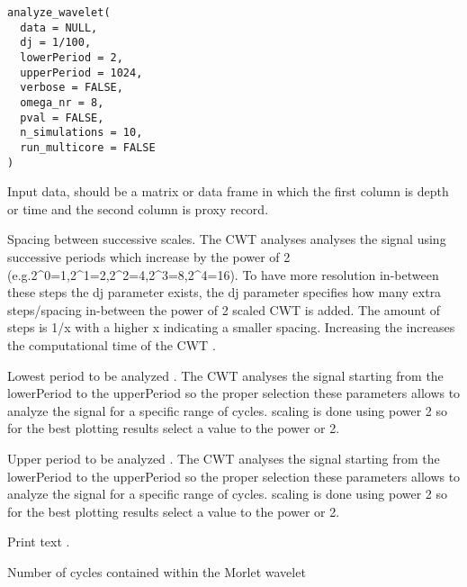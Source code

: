 \documentclass[a4paper]{book}
\begin{document}
%
\begin{Usage}
\begin{verbatim}
analyze_wavelet(
  data = NULL,
  dj = 1/100,
  lowerPeriod = 2,
  upperPeriod = 1024,
  verbose = FALSE,
  omega_nr = 8,
  pval = FALSE,
  n_simulations = 10,
  run_multicore = FALSE
)
\end{verbatim}
\end{Usage}
%
\begin{Arguments}
\begin{ldescription}
\item[\code{data}] Input data, should be a matrix or data frame in which
the first column is depth or time and the second column is proxy record.

\item[\code{dj}] Spacing between successive scales. The CWT analyses analyses the signal using successive periods
which increase by the power of 2 (e.g.2\textasciicircum{}0=1,2\textasciicircum{}1=2,2\textasciicircum{}2=4,2\textasciicircum{}3=8,2\textasciicircum{}4=16). To have more resolution
in-between these steps the dj parameter exists, the dj parameter specifies how many extra steps/spacing in-between
the power of 2 scaled CWT is added. The amount of steps is 1/x with a higher x indicating a smaller spacing.
Increasing the increases the computational time of the CWT .

\item[\code{lowerPeriod}] Lowest period to be analyzed .
The CWT analyses the signal starting from the lowerPeriod to the upperPeriod so the proper selection these
parameters allows to analyze the signal for a specific range of cycles.
scaling is done using power 2 so for the best plotting results select a value to the power or 2.

\item[\code{upperPeriod}] Upper period to be analyzed .
The CWT analyses the signal starting from the lowerPeriod to the upperPeriod so the proper selection these
parameters allows to analyze the signal for a specific range of cycles.
scaling is done using power 2 so for the best plotting results select a value to the power or 2.

\item[\code{verbose}] Print text .

\item[\code{omega\_nr}] Number of cycles contained within the Morlet wavelet


\end{ldescription}
\end{Arguments}
\end{document}
